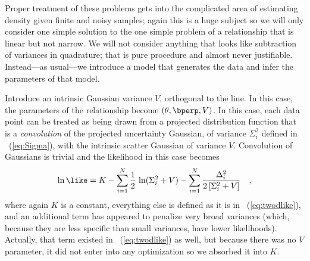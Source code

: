 \documentclass[12pt,twoside,pdftex]{article}
\begin{document}
Proper treatment of these problems gets into the complicated area of
estimating density given finite and noisy samples; again this is a
huge subject so we will only consider one simple solution to the one
simple problem of a relationship that is linear but not narrow.  We
will not consider anything that looks like subtraction of variances in
quadrature; that is pure procedure and almost never
justifiable.  Instead---as usual---we
introduce a model that generates the data and infer the parameters of
that model.

Introduce an intrinsic Gaussian variance $V$, orthogonal to the line.
In this case, the parameters of the relationship become
$(\theta,\bperp,V)$.  In this case, each data point can be treated as
being drawn from a projected distribution function that is a
\emph{convolution} of the projected uncertainty Gaussian, of variance
$\Sigma_i^2$ defined in \equationname~(\ref{eq:Sigma}), with the
intrinsic scatter Gaussian of variance $V$.  Convolution of Gaussians
is trivial and the likelihood in this case becomes
\begin{equation}
\ln\like = K - \sum_{i=1}^N \frac{1}{2}\,\ln(\Sigma_{i}^2+V)
 - \sum_{i=1}^N \frac{\Delta_i^2}{2\,[\Sigma_{i}^2+V]} \quad ,
\end{equation}
where again $K$ is a constant, everything else is defined as it is in
\equationname~(\ref{eq:twodlike}), and an additional term has
appeared to penalize very broad variances (which, because they are
less specific than small variances, have lower likelihoods).
Actually, that term existed in \equationname~(\ref{eq:twodlike}) as
well, but because there was no $V$ parameter, it did not enter into
any optimization so we absorbed it into $K$.
\end{document}
